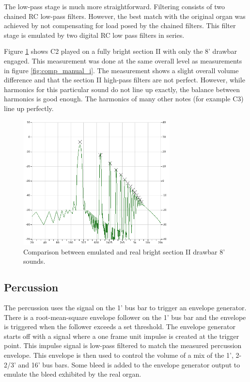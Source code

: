 \documentclass[11pt,a4paper]{article}
\begin{document}
The low-pass stage is much more straightforward. Filtering consists of two chained RC low-pass filters. However, the best match with the original organ was achieved by not compensating for load posed by the chained filters. This filter stage is emulated by two digital RC low pass filters in series.


Figure \ref{fig:comp_manual_ii} shows C2 played on a fully bright section II with only the 8' drawbar engaged. This measurement was done at the same overall level as measurements in figure \ref{fig:comp_manual_i}. The measurement shows a slight overall volume difference and that the section II high-pass filters are not perfect. However, while harmonics for this particular sound do not line up exactly, the balance between harmonics is good enough. The harmonics of many other notes (for example C3) line up perfectly.

\begin{figure}[tbp]
\centering
\includegraphics[width=80mm]{analysis/manual_ii_compare.png}
\caption{Comparison between emulated and real bright section II drawbar 8' sounds.}
\label{fig:comp_manual_ii}
\end{figure}

\subsection{Percussion}

The percussion uses the signal on the 1' bus bar to trigger an envelope generator. There is a root-mean-square envelope follower on the 1' bus bar and the envelope is triggered when the follower exceeds a set threshold. The envelope generator starts off with a signal where a one frame unit impulse is created at the trigger point. This impulse signal is low-pass filtered to match the measured percussion envelope. This envelope is then used to control the volume of a mix of the 1', 2-2/3' and 16' bus bars. Some bleed is added to the envelope generator output to emulate the bleed exhibited by the real organ.
\end{document}
